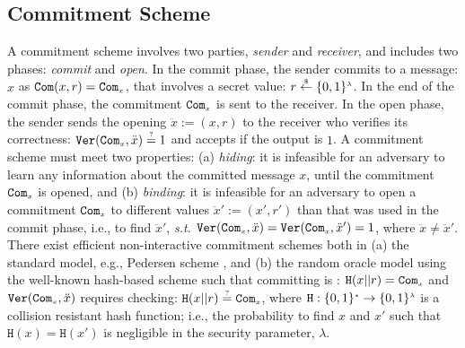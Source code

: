 



\subsection{Commitment Scheme}\label{subsec:commit}


 A commitment scheme involves two parties,  \emph{sender} and  \emph{receiver}, and includes  two phases: \emph{commit} and  \emph{open}. In the commit phase, the sender  commits to a message: $x$ as $\mathtt{Com}(x,r)=\mathtt{Com}_{\scriptscriptstyle x}$, that involves a secret value: $r\stackrel{\scriptscriptstyle\$}\leftarrow \{0,1\}^{\scriptscriptstyle\lambda}$. In the end of the commit phase,  the commitment $\mathtt{Com}_{\scriptscriptstyle x}$ is sent to the receiver. In the open phase, the sender sends the opening $\ddot{x}:=(x,r)$ to the receiver who verifies its correctness: $\mathtt{Ver}(\mathtt{Com}_{\scriptscriptstyle x},\ddot{x})\stackrel{\scriptscriptstyle ?}=1$ and accepts if the output is $1$.  A commitment scheme must meet two properties: (a) \textit{hiding}: it is infeasible for an adversary  to learn any information about the committed  message $x$, until the commitment $\mathtt{Com}_{\scriptscriptstyle x}$ is opened, and (b) \textit{binding}: it is infeasible for an adversary  to open a commitment $\mathtt{Com}_{\scriptscriptstyle x}$ to different values $\ddot{x}':=(x',r')$ than that was  used in the commit phase, i.e.,  to find  $\ddot{x}'$, \textit{s.t.} $\mathtt{Ver}(\mathtt{Com}_{\scriptscriptstyle x},\ddot{x})=\mathtt{Ver}(\mathtt{Com}_{\scriptscriptstyle x},\ddot{x}')=1$, where $\ddot{x}\neq \ddot{x}'$.  There exist efficient non-interactive  commitment schemes both in (a) the standard model, e.g., Pedersen scheme \cite{Pedersen91}, and (b)  the random oracle model using the well-known hash-based scheme such that committing  is : $\mathtt{H}(x||r)=\mathtt{Com}_{\scriptscriptstyle x}$ and $\mathtt{Ver}(\mathtt{Com}_{\scriptscriptstyle x},\ddot{x})$ requires checking: $\mathtt{H}(x||r)\stackrel{\scriptscriptstyle ?}=\mathtt{Com}_{\scriptscriptstyle x}$, where $\mathtt{H}:\{0,1\}^{\scriptscriptstyle *}\rightarrow \{0,1\}^{\scriptscriptstyle\lambda}$ is a collision resistant hash function; i.e., the probability to find $x$ and $x'$ such that $\mathtt{H}(x)=\mathtt{H}(x')$ is negligible in the security parameter, $\lambda$.